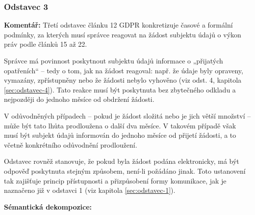 
\subsubsection{Odstavec 3}
\label{sec:odstavec-3}
\begin{displayquote}  \cite{clanek12}
\end{displayquote}

\noindent \textbf{Komentář:}
Třetí odstavec článku 12 GDPR konkretizuje časové a formální podmínky, za kterých musí správce reagovat na žádost subjektu údajů o výkon práv podle článků 15 až 22.

Správce má povinnost poskytnout subjektu údajů informace o „přijatých opatřeních“ – tedy o tom, jak na žádost reagoval: např. že údaje byly opraveny, vymazány, zpřístupněny nebo že žádosti nebylo vyhověno (viz odst. 4, kapitola \ref{sec:odstavec-4}). Tato reakce musí být poskytnuta bez zbytečného odkladu a nejpozději do jednoho měsíce od obdržení žádosti.

V odůvodněných případech – pokud je žádost složitá nebo je jich větší množství – může být tato lhůta prodloužena o další dva měsíce. V takovém případě však musí být subjekt údajů informován do jednoho měsíce od přijetí žádosti, a to včetně konkrétního odůvodnění prodloužení.

Odstavec rovněž stanovuje, že pokud byla žádost podána elektronicky, má být odpověď poskytnuta stejným způsobem, není-li požádáno jinak. Toto ustanovení tak zajišťuje princip přístupnosti a přizpůsobení formy komunikace, jak je naznačeno již v odstavci 1 (viz kapitola \ref{sec:odstavec-1}).

\vspace{1em}

\noindent \textbf{Sémantická dekompozice:}

